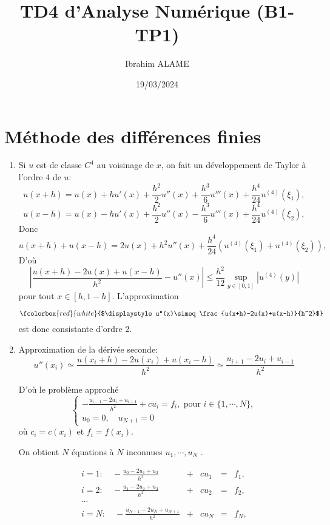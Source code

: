 \documentclass[a4paper,11pt]{article}
\title{TD4 d'Analyse Numérique (B1-TP1) }
\author{Ibrahim ALAME}
\date{19/03/2024}
\newcommand{\myredbox}[1]{\fcolorbox{red}{white}{$\displaystyle#1$}}
\begin{document}
\maketitle

\section{Méthode des différences finies}
\begin{enumerate}
\item Si $u$ est de classe $C^4$ au voisinage de $x$, on fait un développement de Taylor à l'ordre 4 de $u$:
\[u(x+h)=u(x)+h u'(x)+\frac{h^2}2 u''(x)+\frac{h^3}6 u'''(x)+\frac{h^4}{24} u^{(4)}(\xi_1) ,\]
\[u(x-h)=u(x)-h u'(x)+\frac{h^2}2 u''(x)-\frac{h^3}6 u'''(x)+\frac{h^4}{24} u^{(4)}(\xi_2) ,\]
Donc
\[u(x+h)+u(x-h)=2u(x)+h^2 u''(x)+\frac{h^4}{24} \left(u^{(4)}(\xi_1) + u^{(4)}(\xi_2)\right) ,\]
D'où
\[\left| \frac{u(x+h)-2u(x)+u(x-h)}{h^2}- u''(x) \right|\leq \frac{h^2}{12}\sup_{y\in[0,1]} |u^{(4)}(y)| \]
pour tout $x \in [h, 1 - h]$. L'approximation 

 \[\myredbox{u''(x)\simeq \frac{u(x+h)-2u(x)+u(x-h)}{h^2}}\] 
 est donc consistante d'ordre 2. 
\item Approximation de la dérivée seconde:
\[u''(x_i)\simeq \frac{u(x_i+h)-2u(x_i)+u(x_i-h)}{h^2}\simeq \frac{u_{i+1}-2u_i+u_{i-1}}{h^2}\] 


D'où le problème approché
\begin{equation}
\left\{\begin{array}{l}
-{\displaystyle \frac{u_{i-1}-2u_i+u_{i+1}}{h^2}+c u_i }= f_i, \mbox { pour } i\in\{1, \cdots , N\},\\
u_0=0,\quad u_{N+1}=0
\end{array}
\right.
\end{equation}
où $c_i=c(x_i)$ et $f_i=f(x_i)$.

On obtient $N$ équations à $N$ inconnues $u_1, \cdots , u_N$ . 

\[\begin{array}{lllll}
i=1:\quad -{\displaystyle \frac{u_{0}-2u_1+u_{2}}{h^2} }&+&c u_1&=& f_1, \\
i=2:\quad -{\displaystyle \frac{u_{1}-2u_2+u_{3}}{h^2} }&+&c u_2 &= &f_2, \\
\cdots&&&&\\
i=N:\quad -{\displaystyle \frac{u_{N-1}-2u_{N}+u_{N+1}}{h^2} }&+&c u_{N} &=& f_{N},


\end{array}\]
\end{enumerate}
\end{document}
